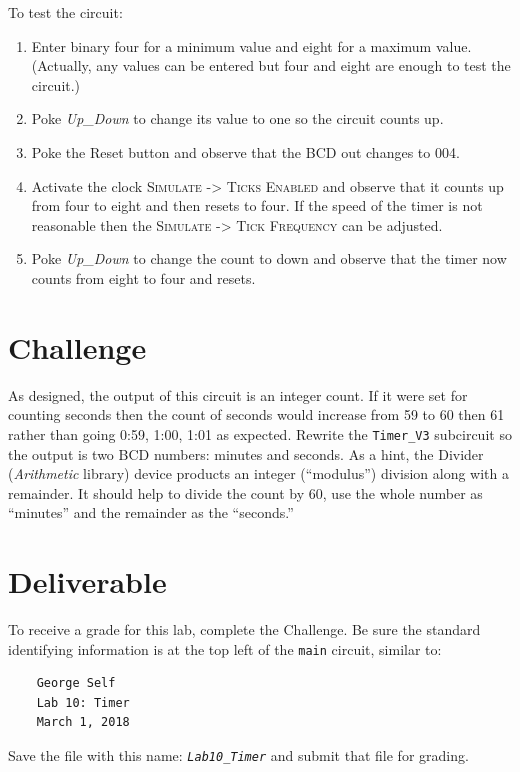 To test the circuit:

\begin{enumerate}
	\item Enter binary four for a minimum value and eight for a maximum value. (Actually, any values can be entered but four and eight are enough to test the circuit.) 
	\item Poke \textit{Up\_Down} to change its value to one so the circuit counts up.
	\item Poke the Reset button and observe that the BCD out changes to 004.
	\item Activate the clock \textsc{Simulate -> Ticks Enabled} and observe that it counts up from four to eight and then resets to four. If the speed of the timer is not reasonable then the \textsc{Simulate -> Tick Frequency} can be adjusted.
	\item Poke \textit{Up\_Down} to change the count to down and observe that the timer now counts from eight to four and resets.
\end{enumerate}

\section{Challenge}

As designed, the output of this circuit is an integer count. If it were set for counting seconds then the count of seconds would increase from 59 to 60 then 61 rather than going 0:59, 1:00, 1:01 as expected. Rewrite the \lstinline[columns=fixed]|Timer_V3| subcircuit so the output is two BCD numbers: minutes and seconds. As a hint, the Divider (\textit{Arithmetic} library) device products an integer (``modulus'') division along with a remainder. It should help to divide the count by 60, use the whole number as ``minutes'' and the remainder as the ``seconds.''

\section{Deliverable}

To receive a grade for this lab, complete the Challenge. Be sure the standard identifying information is at the top left of the \lstinline{main} circuit, similar to: 

\bigskip
\begin{minipage}{\linewidth}
	\begin{verbatim}
	George Self
	Lab 10: Timer
	March 1, 2018
	\end{verbatim}
\end{minipage}
\bigskip

Save the file with this name: \emph{\texttt{Lab10\_Timer}} and submit that file for grading.

